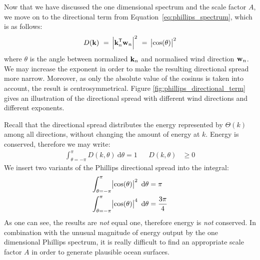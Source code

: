 %

Now that we have discussed the one dimensional \wavenumber spectrum and the 
scale factor $A$, we move on to the directional term from 
Equation~\ref{eq:phillips_spectrum}, which is as follows:
\begin{equation*}
 D(\mathbf{k})~=~\abs{\mathbf{k}_n^{\mathsf{T}}\mathbf{w}_n}^2~=~\abs{\cos(\theta)}^2
\end{equation*}
where $\theta$ is the angle between normalized \wavevector $\mathbf{k}_n$ and
normalised wind direction $\mathbf{w}_n$.
We may increase the exponent in 
order to make the resulting directional spread more narrow. Moreover, as only
the  absolute value of the cosinus is taken into account, the result is
centrosymmetrical. Figure \ref{fig:phillips_directional_term} gives an
illustration of the directional spread with different wind directions and
different exponents.

Recall that the directional spread distributes the energy represented by
$\Theta(k)$ among all directions, without changing the amount of energy at
\wavenumber $k$. Energy is conserved, therefore we may write:
\begin{align*}
\int_{\theta=-\pi}^{\pi}D(k,\theta)~\mathrm{d}\theta = 1 && D(k,\theta) &\geq 0
\end{align*}
We insert two variants of the Phillips directional spread into the integral:
\begin{align*}
\int_{\theta=-\pi}^{\pi} \abs{\cos(\theta)}^2~\mathrm{d}\theta &= \pi \\
\int_{\theta=-\pi}^{\pi} \abs{\cos(\theta)}^4~\mathrm{d}\theta &= \frac{3\pi}{4}
\end{align*}
As one can see, the results are \emph{not} equal one, therefore energy is 
\emph{not} conserved. In combination with the unusual magnitude of energy 
output by the one dimensional Phillips \wavenumber spectrum, it is really 
difficult to find an appropriate scale factor $A$ in order to generate 
plausible ocean surfaces.
%
